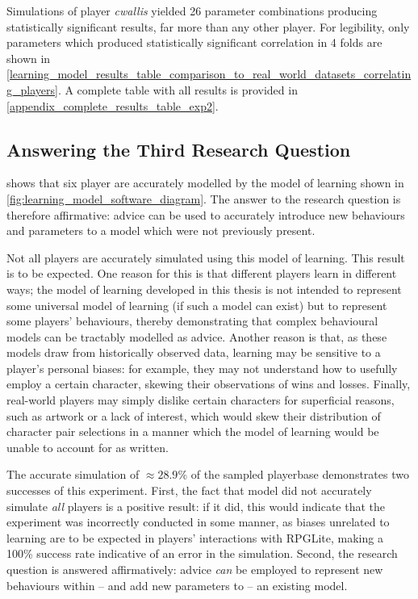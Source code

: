 Simulations of player \emph{cwallis} yielded 26 parameter combinations producing
statistically significant results, far more than any other player. For
legibility, only parameters which produced statistically significant correlation
in 4 folds are shown in
\cref{learning_model_results_table_comparison_to_real_world_datasets_correlating_players}.
A complete table with all results is provided in
\cref{appendix_complete_results_table_exp2}.


\subsection{Answering the Third Research Question}

 shows that
six player are accurately modelled by the \aspectoriented model of learning
shown in \cref{fig:learning_model_software_diagram}. The answer to the research
question is therefore affirmative: advice can be used to accurately introduce
new behaviours and parameters to a model which were not previously present.

Not all players are accurately simulated using this model of learning. This
result is to be expected. One reason for this is that different players learn in
different ways; the model of learning developed in this thesis is not intended
to represent some universal model of learning (if such a model can exist) but to
represent some players' behaviours, thereby demonstrating that complex
behavioural models can be tractably modelled as advice. Another reason is that,
as these models draw from historically observed data, learning may be sensitive
to a player's personal biases: for example, they may not understand how to
usefully employ a certain character, skewing their observations of wins and
losses. Finally, real-world players may simply dislike certain characters for
superficial reasons, such as artwork or a lack of interest, which would skew
their distribution of character pair selections in a manner which the model of
learning would be unable to account for as written.

The accurate simulation of $\approx{}28.9\%$ of the sampled playerbase demonstrates two
successes of this experiment. First, the fact that model did not accurately
simulate \emph{all} players is a positive result: if it did, this would indicate
that the experiment was incorrectly conducted in some manner, as biases
unrelated to learning are to be expected in players' interactions with RPGLite,
making a 100\% success rate indicative of an error in the simulation. Second,
the research question is answered affirmatively: advice \emph{can} be employed
to represent new behaviours within -- and add new parameters to -- an existing model. 




